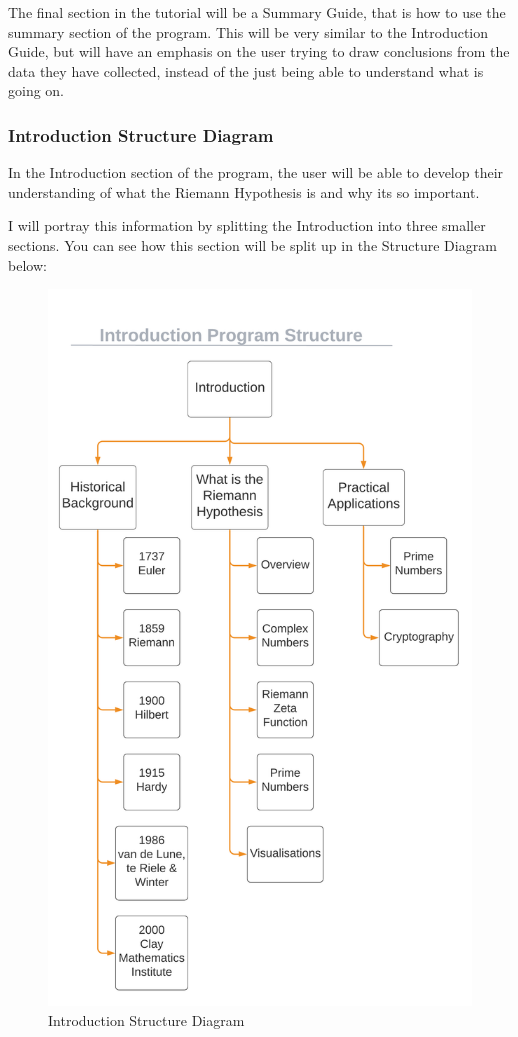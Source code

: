 \documentclass{article}
\begin{document}
The final section in the tutorial will be a Summary Guide, that is how to use the summary section of the program. This will be very similar to the Introduction Guide, but will have an emphasis on the user trying to draw conclusions from the data they have collected, instead of the just being able to understand what is going on.
\clearpage
\subsubsection{Introduction Structure Diagram}
In the Introduction section of the program, the user will be able to develop their understanding of what the Riemann Hypothesis is and why its so important.

I will portray this information by splitting the Introduction into three smaller sections. You can see how this section will be split up in the Structure Diagram below:

\begin{figure}[h]
    \centering
    \captionsetup{justification=centering}
    \includegraphics[scale=0.385]{introduction-structure-diagram}
    \caption{Introduction Structure Diagram}
\end{figure}
\end{document}
